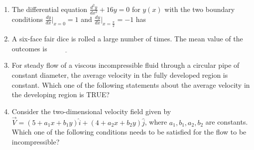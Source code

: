 \documentclass[journal]{IEEEtran}
\begin{document}
\begin{enumerate}[leftmargin=0pt]
    \item The differential equation $\frac{d^2 y}{dx^2} + 16y = 0$ for $y(x)$ with the two boundary conditions $\frac{dy}{dx}\bigg|_{x=0} = 1$ and $\frac{dy}{dx}\bigg|_{x=\frac{\pi}{2}} = -1$ has

    \hfill{}

    \begin{enumerate}
    \end{enumerate}

    \item A six-face fair dice is rolled a large number of times. The mean value of the outcomes is
        $\underline{\hspace{2cm}}$

    \hfill{}

    \item For steady flow of a viscous incompressible fluid through a circular pipe of constant diameter, the average velocity in the fully developed region is constant. Which one of the following statements about the average velocity in the developing region is TRUE?

    \hfill{}

    \begin{enumerate}
    \end{enumerate}

    \item Consider the two-dimensional velocity field given by $\vec{V} = (5 + a_1 x + b_1 y)\hat{i} + (4 + a_2 x + b_2 y)\hat{j}$, where $a_1, b_1, a_2, b_2$ are constants. Which one of the following conditions needs to be satisfied for the flow to be incompressible?


\end{enumerate}
\end{document}
